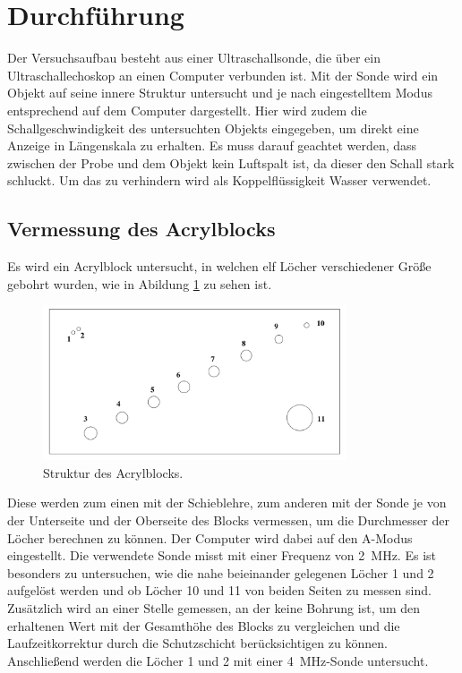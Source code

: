 \section{Durchführung}
\label{sec:Durchführung}
Der Versuchsaufbau besteht aus einer Ultraschallsonde, die über ein Ultraschallechoskop an einen Computer verbunden ist.
Mit der Sonde wird ein Objekt auf seine innere Struktur untersucht und je nach eingestelltem Modus entsprechend auf dem Computer dargestellt.
Hier wird zudem die Schallgeschwindigkeit des untersuchten Objekts eingegeben, um direkt eine Anzeige in Längenskala zu erhalten.
Es muss darauf geachtet werden, dass zwischen der Probe und dem Objekt kein Luftspalt ist, da dieser den Schall stark schluckt.
Um das zu verhindern wird als Koppelflüssigkeit Wasser verwendet.
\subsection{Vermessung des Acrylblocks}
Es wird ein Acrylblock untersucht, in welchen elf Löcher verschiedener Größe gebohrt wurden, wie in Abildung \ref{blockloch} zu sehen ist.
\begin{figure}[H]
    \centering
    \includegraphics[width=0.8\textwidth]{content/block.png}
    \caption{Struktur des Acrylblocks. \cite{us2}}
    \label{blockloch}
\end{figure}
\noindent
Diese werden zum einen mit der Schieblehre, zum anderen mit der Sonde je von der Unterseite und der Oberseite des Blocks vermessen, um die Durchmesser der Löcher berechnen zu können.
Der Computer wird dabei auf den A-Modus eingestellt.
Die verwendete Sonde misst mit einer Frequenz von \SI{2}{\mega\hertz}.
Es ist besonders zu untersuchen, wie die nahe beieinander gelegenen Löcher 1 und 2 aufgelöst werden und ob Löcher 10 und 11 von beiden Seiten zu messen sind.
Zusätzlich wird an einer Stelle gemessen, an der keine Bohrung ist, um den erhaltenen Wert mit der Gesamthöhe des Blocks zu vergleichen und 
die Laufzeitkorrektur durch die Schutzschicht berücksichtigen zu können.
Anschließend werden die Löcher 1 und 2 mit einer \SI{4}{\mega\hertz}-Sonde untersucht.


